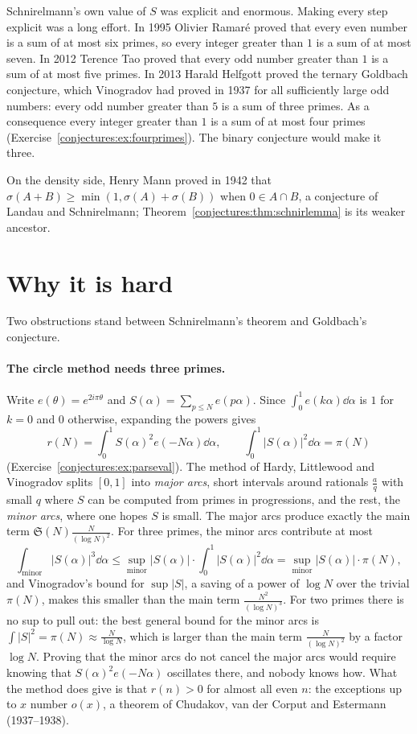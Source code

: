 \begin{remark}
Schnirelmann's own value of $S$ was explicit and enormous. Making every step explicit was a long effort. In 1995 Olivier Ramar\'e proved that every
even number is a sum of at most six primes, so every integer greater than $1$ is a sum of at most seven. In 2012 Terence Tao proved that every odd
number greater than $1$ is a sum of at most five primes. In 2013 Harald Helfgott proved the ternary Goldbach conjecture, which Vinogradov had proved
in 1937 for all sufficiently large odd numbers: every odd number greater than $5$ is a sum of three primes. As a consequence every integer greater
than $1$ is a sum of at most four primes (Exercise~\ref{conjectures:ex:fourprimes}). The binary conjecture would make it three.

On the density side, Henry Mann proved in 1942 that $\sigma(A+B)\ge\min(1,\sigma(A)+\sigma(B))$ when $0\in A\cap B$, a conjecture of Landau and
Schnirelmann; Theorem~\ref{conjectures:thm:schnirlemma} is its weaker ancestor.
\end{remark}

\section{Why it is hard}

Two obstructions stand between Schnirelmann's theorem and Goldbach's conjecture.

\paragraph{The circle method needs three primes.} Write $e(\theta)=e^{2i\pi\theta}$ and $S(\alpha)=\sum_{p\le N}e(p\alpha)$. Since
$\int_0^1e(k\alpha)\dd\alpha$ is $1$ for $k=0$ and $0$ otherwise, expanding the powers gives
\[
r(N)=\int_0^1S(\alpha)^2e(-N\alpha)\dd\alpha,\qquad\int_0^1|S(\alpha)|^2\dd\alpha=\pi(N)
\]
(Exercise~\ref{conjectures:ex:parseval}). The method of Hardy, Littlewood and Vinogradov splits $[0,1]$ into \emph{major arcs}, short intervals around rationals
$\frac aq$ with small $q$ where $S$ can be computed from primes in progressions, and the rest, the \emph{minor arcs}, where one hopes $S$ is small. The
major arcs produce exactly the main term $\mathfrak S(N)\frac N{(\log N)^2}$. For three primes, the minor arcs contribute at most
\[
\int_{\text{minor}}|S(\alpha)|^3\dd\alpha\le\sup_{\text{minor}}|S(\alpha)|\cdot\int_0^1|S(\alpha)|^2\dd\alpha=\sup_{\text{minor}}|S(\alpha)|\cdot\pi(N),
\]
and Vinogradov's bound for $\sup|S|$, a saving of a power of $\log N$ over the trivial $\pi(N)$, makes this smaller than the main term
$\frac{N^2}{(\log N)^3}$. For two primes there is no sup to pull out: the best general bound for the minor arcs is $\int|S|^2=\pi(N)\approx\frac N{\log N}$,
which is larger than the main term $\frac N{(\log N)^2}$ by a factor $\log N$. Proving that the minor arcs do not cancel the major arcs would require
knowing that $S(\alpha)^2e(-N\alpha)$ oscillates there, and nobody knows how. What the method does give is that $r(n)>0$ for almost all even $n$: the
exceptions up to $x$ number $o(x)$, a theorem of Chudakov, van der Corput and Estermann (1937--1938).

